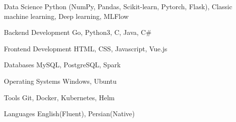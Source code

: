

\begin{cvskills}

  \cvskill
    {Data Science} %
    {Python (NumPy, Pandas, Scikit-learn, Pytorch, Flask), Classic machine learning, Deep learning, MLFlow} %

  \cvskill
    {Backend Development} %
    {Go, Python3, C, Java, C\#} %

  \cvskill
    {Frontend Development} %
    {HTML, CSS, Javascript, Vue.js} %

  \cvskill
    {Databases} %
    {MySQL, PostgreSQL, Spark} %

  \cvskill
    {Operating Systems} %
    {Windows, Ubuntu} %

  \cvskill
    {Tools} %
    {Git, Docker, Kubernetes, Helm} %

  \cvskill
    {Languages} %
    {English(Fluent), Persian(Native)} %

\end{cvskills}
